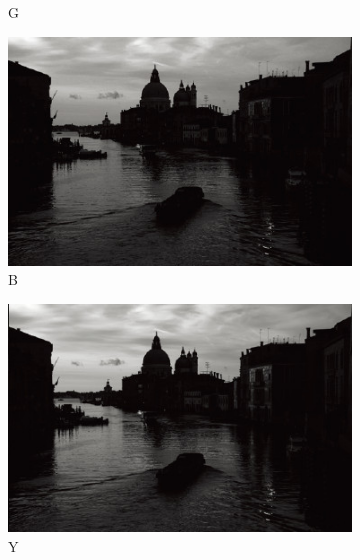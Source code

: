 \documentclass[letterpaper,10pt]{article}
\begin{document}
\begin{figure}[htbp]
\begin{subfigure}{0.11\textwidth}
					\captionsetup{font=scriptsize}
					\caption*{G}
					\label{fig: G3}
				\end{subfigure}
				\begin{subfigure}{0.11\textwidth}
					\includegraphics[width=\linewidth]{picture/LLIE/Division Gets Better/B3}
					\captionsetup{font=scriptsize}
					\caption*{B}
					\label{fig: B3}
				\end{subfigure}
				\begin{subfigure}{0.11\textwidth}
					\includegraphics[width=\linewidth]{picture/LLIE/Division Gets Better/Y3}
					\captionsetup{font=scriptsize}
					\caption*{Y}
					\label{fig: Y3}
				\end{subfigure}
				\begin{subfigure}{0.11\textwidth}

\end{subfigure}
\end{figure}
\end{document}
